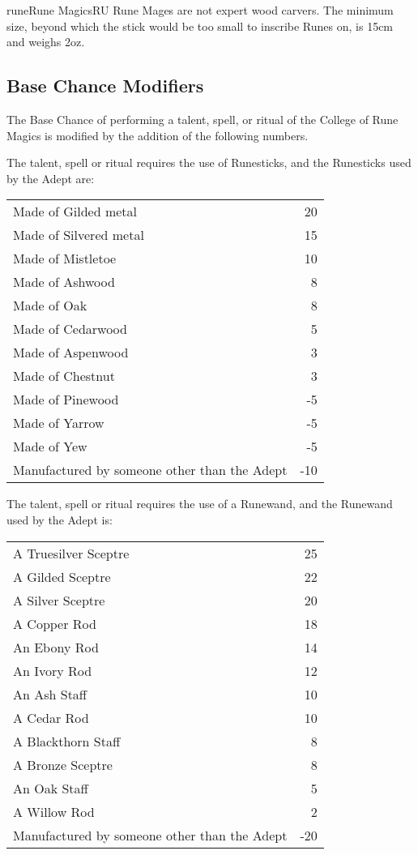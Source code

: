 \begin{college}[1.1]{rune}{Rune Magics}{RU}
Rune Mages are not expert wood carvers.  The minimum size, beyond
which the stick would be too small to inscribe Runes on, is 15cm
\x 2cm \x 1cm and weighs 2oz.

\subsection{Base Chance Modifiers}
\label{rune:modifiers}

The Base Chance of performing a talent, spell, or ritual of the
College of Rune Magics is modified by the addition of the following
numbers.

The talent, spell or ritual requires the use of Runesticks, and the
Runesticks used by the Adept are:

\begin{tabularx}{\linewidth}{Xr}
Made of Gilded metal   &  20 \\
Made of Silvered metal &  15 \\
Made of Mistletoe      &  10 \\
Made of Ashwood        &   8 \\
Made of Oak            &   8 \\
Made of Cedarwood      &   5 \\
Made of Aspenwood      &   3 \\
Made of Chestnut       &   3 \\
Made of Pinewood       &  -5 \\
Made of Yarrow         &  -5 \\
Made of Yew            &  -5 \\
Manufactured by someone other than the Adept  & -10 \\
\end{tabularx}

The talent, spell or ritual requires the use of a Runewand, and the
Runewand used by the Adept is:

\begin{tabularx}{\linewidth}{Xr}
A Truesilver Sceptre           &  25 \\
A Gilded Sceptre               &  22 \\
A Silver Sceptre               &  20 \\
A Copper Rod                   &  18 \\
An Ebony Rod                   &  14 \\
An Ivory Rod                   &  12 \\
An Ash Staff                   &  10 \\
A Cedar Rod                    &  10 \\
A Blackthorn Staff             &   8 \\
A Bronze Sceptre               &   8 \\
An Oak Staff                   &   5 \\
A Willow Rod                   &   2 \\
Manufactured by someone other than the Adept & -20 \\
\end{tabularx}


\end{college}
